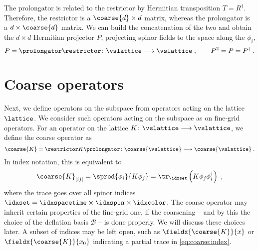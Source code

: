 The prolongator is related to the restrictor by Hermitian transposition $T = R^{\dagger}$.
Therefore, the restrictor is a $\coarse{d} \times d$ matrix, whereas the prolongator is a $d \times \coarse{d}$ matrix.
We can build the concatenation of the two and obtain the $d \times d$ Hermitian projector $P$, projecting spinor fields to the space along the $\phi_{i}$,
\begin{equation} \label{eq:P}
P = \prolongator \restrictor \colon \vslattice \longrightarrow \vslattice \;,
\qquad
P^{2} = P = P^{\dagger} \;.
\end{equation}

\section{Coarse operators}
\label{sec:sd:coarse:ops}

Next, we define operators on the subspace from operators acting on the lattice $\lattice$.
We consider such operators acting on the subspace as  on fine-grid operators.
For an operator on the lattice $K \colon \vslattice \longrightarrow \vslattice$, we define the coarse operator as
\begin{equation} \label{eq:sd:coarse:op}
\coarse{K} = \restrictor K \prolongator \colon \coarse{\vslattice} \longrightarrow \coarse{\vslattice} \;.
\end{equation}
In index notation, this is equivalent to
\begin{equation} \label{eq:coarse:index}
\coarse{K}_{[i j]} =
\sprod{ \phi_{i} }{ K \phi_{j} } =
\tr_{\idxset} \left( K \phi_j \phi_i^\dagger \right) \;,
\end{equation}
where the trace goes over all spinor indices $\idxset = \idxspacetime \times \idxspin \times \idxcolor$.
The coarse operator may inherit certain properties of the fine-grid one, if the coarsening -- and by this the choice of the deflation basis $\mathcal{B}$ --  is done properly.
We will discuss these choices later.
A subset of indices may be left open, such as $\fieldx{\coarse{K}}{x}$ or $\fieldx{\coarse{K}}{x_0}$ indicating a partial trace in \cref{eq:coarse:index}.

